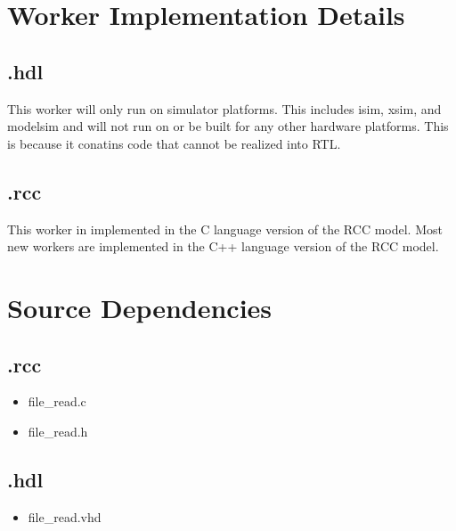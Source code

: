 \section*{Worker Implementation Details}
\subsection*{\comp.hdl}
\begin{flushleft}
This worker will only run on simulator platforms.  This includes isim, xsim, and modelsim and will not run on or be built for any other hardware platforms.  This is because it conatins code that cannot be realized into RTL.
\end{flushleft}
\subsection*{\comp.rcc}
\begin{flushleft}
This worker in implemented in the C language version of the RCC model.  Most new workers are implemented in the C++ language version of the RCC model.
\end{flushleft}

\section*{Source Dependencies}
\subsection*{\comp.rcc}
\begin{itemize}
\item file\_read.c
\item file\_read.h
\end{itemize}
\subsection*{\comp.hdl}
\begin{itemize}
\item file\_read.vhd
\end{itemize}


